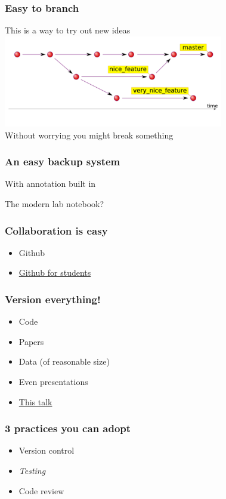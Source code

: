 \documentclass{beamer}
\begin{document}
\begin{frame}
\frametitle{Easy to branch}
This is a way to try out new ideas
\includegraphics[height=4cm]{figures/git2.pdf}
\pause
\\
Without worrying you might break something
\end{frame}

\begin{frame}
\frametitle{An easy backup system}

With annotation built in

\end{frame}

\begin{frame}

The modern lab notebook?

\end{frame}


\begin{frame}
\frametitle{Collaboration is easy}
\begin{itemize}
\pause
\item
Github 
\pause
\item
\href{https://education.github.com/}{Github for students}
\end{itemize}
\end{frame}


\begin{frame}
\frametitle{Version everything!}
\begin{itemize}
\pause
\item
Code
\pause
\item
Papers
\pause
\item
Data (of reasonable size)
\pause 
\item
Even presentations
\pause
\item
\href{https://github.com/arokem/frisem-20141016}{This talk}
\end{itemize}
\end{frame}


\begin{frame}
\frametitle{3 practices you can adopt}
\begin{itemize}
\item
Version control
\item
\emph{Testing}
\item
Code review 
\end{itemize}
\end{frame}
\end{document}
